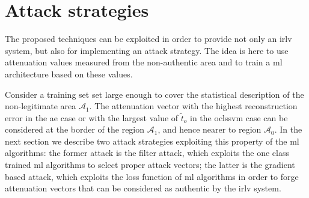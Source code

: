 \documentclass[draftcls,onecolumn,12pt]{IEEEtran}
\newcommand{\Exp}[1]{\mathbb{E}\left[#1\right]}
\begin{document}

\section{Attack strategies}
\label{sec:attack}
The proposed techniques can be exploited in order to provide not only an \ac{irlv} system, but also for implementing an attack strategy. The idea is here to use attenuation values measured from the non-authentic area and to train a \ac{ml} architecture based on these values.

Consider a training set set large enough to cover the statistical description of the non-legitimate area $\mathcal{A}_1$. The attenuation vector with the highest reconstruction error in the \ac{ae} case or with the largest value of $\tilde{t}_o$ in the \ac{oclssvm} case can be considered at the border of the region $\mathcal{A}_1$, and hence nearer to region $\mathcal{A}_0$. In the next section we describe two attack strategies exploiting this property of the \ac{ml} algorithms: the former attack is the filter attack, which exploits the one class trained \ac{ml} algorithms to select proper attack vectors; the latter is the gradient based attack, which exploits the loss function of \ac{ml} algorithms in order to forge attenuation vectors that can be considered as authentic by the \ac{irlv} system.
\end{document}
